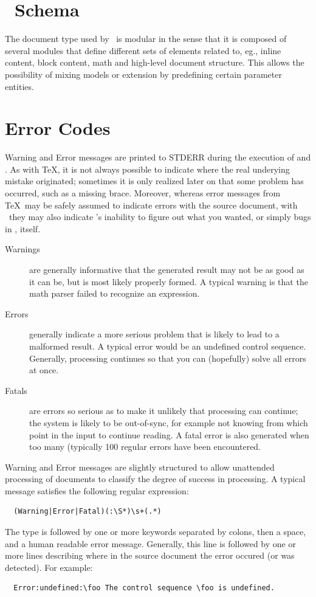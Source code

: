 \documentclass{book}
\begin{document}
\chapter[Schema]{\LaTeXML\ Schema}\label{schema}
The document type used by \LaTeXML\ is modular in the sense
that it is composed of several modules that define different
sets of elements related to, eg., inline content, block content,
math and high-level document structure.  This allows the possibility
of mixing models or extension by predefining certain parameter entities.



\chapter{Error Codes}\label{errorcodes}
Warning and Error messages are printed to STDERR during the execution
of  and .  As with \TeX, it is
not always possible to indicate where the real underying mistake
originated; sometimes it is only realized later on that some problem
has occurred, such as a missing brace. Moreover, whereas error messages
from \TeX\ may be safely assumed to indicate errors with the source
document, with \LaTeXML\ they may also indicate \LaTeXML's inability
to figure out what you wanted, or simply bugs in \LaTeXML, itself.

\begin{description}
\item[Warnings] are generally
informative that the generated result may not be as good as it can be,
but is most likely properly formed.  A typical warning is that
the math parser failed to recognize an expression.
\item[Errors] generally indicate a more serious problem that is likely
to lead to a malformed result.  A typical error would be an undefined
control sequence.  Generally, processing continues so that you can
(hopefully) solve all errors at once.
\item[Fatals] are errors so serious as to make it unlikely that processing
can continue; the system is likely to be out-of-sync, for example
not knowing from which  point in the input to continue reading.
A fatal error is also generated when too many (typically 100 regular errors
have been encountered.
\end{description}

Warning and Error messages are slightly structured to allow
unattended processing of documents to classify the degree
of success in processing. A typical message satisfies the following regular expression:
\begin{verbatim}
  (Warning|Error|Fatal)(:\S*)\s+(.*)
\end{verbatim}
The type is followed by one or more keywords separated by colons,
then a space, and a human readable error message.
Generally, this line is followed by one or more lines describing
where in the source document the error occured (or was detected).
For example:
\begin{verbatim}
  Error:undefined:\foo The control sequence \foo is undefined.
\end{verbatim}
\end{document}

